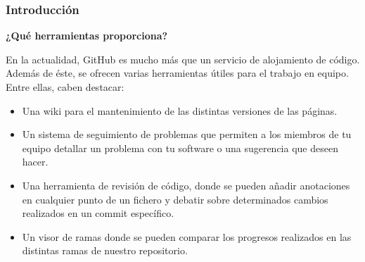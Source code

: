 \documentclass{beamer}
\begin{document}
		\begin{frame}
			\frametitle{Introducción}
			\begin{center}\textbf{\Large ¿Qué herramientas proporciona?}\end{center}
			{\small En la actualidad, GitHub es mucho más que un servicio de alojamiento de código. Además de éste, se 			ofrecen varias herramientas útiles para el trabajo en equipo. Entre ellas, caben destacar:}
			{\footnotesize
			\begin{itemize}
			\item Una wiki para el mantenimiento de las distintas versiones de las páginas.
			\item Un sistema de seguimiento de problemas que permiten a los miembros de tu equipo detallar un problema 			con tu software o una sugerencia que deseen hacer.
			\item Una herramienta de revisión de código, donde se pueden añadir anotaciones en cualquier punto de un 				fichero y debatir sobre determinados cambios realizados en un commit específico.
			\item Un visor de ramas donde se pueden comparar los progresos realizados en las distintas ramas de 						nuestro repositorio.
			\end{itemize}}
		\end{frame}
\end{document}
